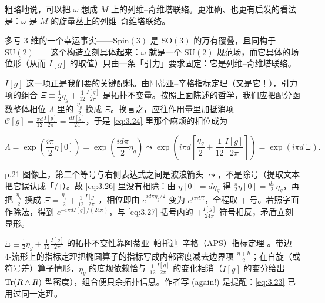 粗略地说，可以把 $\omega$ 想成 $M$ 上的列维–奇维塔联络。更准确、也更有启发的看法是：$\omega$ 是 $M$ 的旋量丛上的列维–奇维塔联络。

多亏 3 维的一个幸运事实——$\mathrm{Spin}(3)$ 是 $\mathrm{SO}(3)$ 的万有覆叠，且同构于 $\mathrm{SU}(2)$——这个构造立刻具体起来：$\omega$ 就是一个 $\mathrm{SU}(2)$ 规范场，而它具体的场位形（从而 $I[g]$ 的取值）只由一条「引力」要求固定：它是列维–奇维塔联络。

$I[g]$ 这一项正是我们要的关键配料。由阿蒂亚–辛格指标定理（又是它！），引力项的组合 $\Xi\equiv\frac{1}{2}\eta_g+\frac{1}{12}\frac{I[g]}{2\pi}$ 是拓扑不变量。按照上面陈述的哲学，我们应把配分函数整体相位 $\Lambda$ 里的 $\frac{\eta_g}{2}$ 换成 $\Xi$。换言之，应往作用量里加抵消项 $\mathcal{C}[g]=\frac{\pi d}{12}\frac{I[g]}{2\pi}=\frac{dI[g]}{24}$，于是 \eqref{eq:3.24} 里那个麻烦的相位成为

\begin{equation}\tag{3.26}\label{eq:3.26}
  \Lambda = \exp\left(\frac{i\pi}{2}\eta[0]\right)
        = \exp\left(\frac{id\pi}{2}\eta_g\right)
        \leadsto \exp\left(i\pi d\left[\frac{\eta_g}{2}+\frac{1}{12}\frac{I[g]}{2\pi}\right]\right)
        = \exp(i\pi d\,\Xi).
\end{equation}

\begin{yizhu}[易错点]
p.21 图像上，第二个等号与右侧表达式之间是波浪箭头 $\leadsto$，不是除号（提取文本把它误认成「/」）。故 \eqref{eq:3.26} 里没有相除：由 $\eta[0]=d\eta_g$ 得 $\frac{\pi}{2}\eta[0]=\frac{d\pi}{2}\eta_g$，再把 $\frac{\eta_g}{2}$ 换成 $\Xi=\frac{\eta_g}{2}+\frac{1}{12}\frac{I[g]}{2\pi}$，相位即由 $e^{id\pi\eta_g/2}$ 变为 $e^{i\pi d\Xi}$，全程取 $+$ 号。若照字面作除法，得到 $e^{-i\pi dI[g]/(24\pi)}$，与 \eqref{eq:3.27} 括号内的 $+\frac{I[g]}{24\pi}$ 符号相反，矛盾立刻显形。
\end{yizhu}

\begin{yizhu}[含糊点]
$\Xi\equiv\frac{1}{2}\eta_g+\frac{1}{12}\frac{I[g]}{2\pi}$ 的拓扑不变性靠阿蒂亚–帕托迪–辛格（APS）指标定理 \cite{aps1975,aps1976a,aps1976b}。带边 4-流形上的指标定理把椭圆算子的指标写成内部密度减去边界项 $\frac{\eta+h}{2}$；在自旋（或符号差）算子情形，$\eta_g$ 的度规依赖恰与 $\frac{1}{12}\frac{I[g]}{2\pi}$ 的变化相消（$I[g]$ 的变分给出 $\operatorname{Tr}(R\wedge R)$ 型密度），组合便只余拓扑信息。作者写 (again!) 是提醒：\eqref{eq:3.23} 已用过同一定理。
\end{yizhu}

